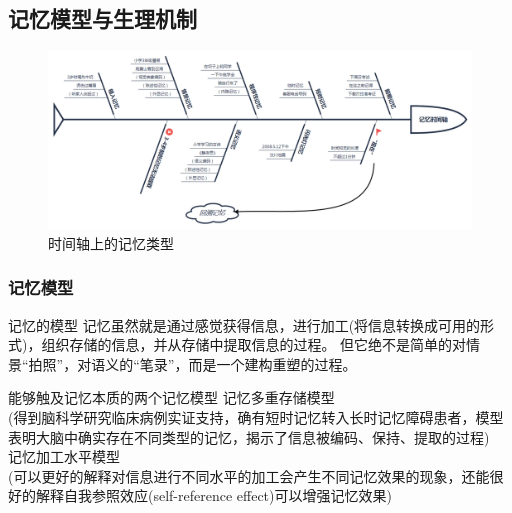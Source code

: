 \documentclass[serif]{beamer}
\begin{document}
  \subsection{记忆模型与生理机制}
  \begin{frame}
  	  \begin{figure}
  	  	\includegraphics[scale=0.25]{timeaxis.png}
  	  	\caption{时间轴上的记忆类型}
  	  \end{figure}
  \end{frame}
  
  \subsubsection{记忆模型}
  \begin{frame}{记忆的模型}
        记忆虽然就是通过感觉获得信息，进行加工(将信息转换成可用的形式)，组织存储的信息，并从存储中提取信息的过程。
        但它绝不是简单的对情景“拍照”，对语义的“笔录”，而是一个建构重塑的过程。
        \pause
        \begin{block}{能够触及记忆本质的两个记忆模型}
        	记忆多重存储模型\\
        	{\tiny (得到脑科学研究临床病例实证支持，确有短时记忆转入长时记忆障碍患者，模型表明大脑中确实存在不同类型的记忆，揭示了信息被编码、保持、提取的过程)}\\
            记忆加工水平模型\\
            {\tiny (可以更好的解释对信息进行不同水平的加工会产生不同记忆效果的现象，还能很好的解释自我参照效应(self-reference effect)可以增强记忆效果)}
        \end{block}
  \end{frame}
  
  
\end{document}
